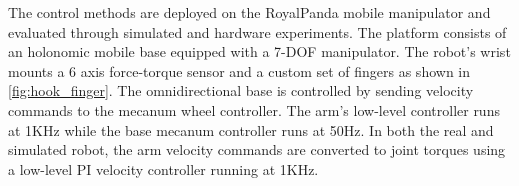 The control methods are deployed on the RoyalPanda mobile manipulator and evaluated through simulated and hardware experiments. The platform consists of an holonomic mobile base equipped with a 7-DOF manipulator. The robot's wrist mounts a 6 axis force-torque sensor and a custom set of fingers as shown in \fig\ref{fig:hook_finger}.  The omnidirectional base is controlled by sending velocity commands to the mecanum wheel controller. The arm's low-level controller runs at 1KHz while the base mecanum controller runs at 50Hz. In both the real and simulated robot, the arm velocity commands are converted to joint torques using a low-level PI velocity controller running at 1KHz. 




